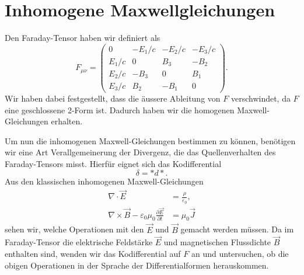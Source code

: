 %
%
%
%
\section{Inhomogene Maxwellgleichungen
	\label{maxwell:section:InhomogeneMaxwellgleichungen}}
Den Faraday-Tensor haben wir definiert als
\begin{equation*}
	F_{\mu \nu} = \begin{pmatrix}
		0 & -E_1/c & -E_2/c & -E_3/c \\ E_1/c & 0 & B_3 & -B_2 \\ E_2/c & -B_3 & 0 & B_1 \\ E_3/c & B_2 & -B_1 & 0 
	\end{pmatrix}.
\end{equation*}
Wir haben dabei festgestellt, dass die äussere Ableitung von $F$ verschwindet, da $F$ eine geschlossene 2-Form ist. Dadurch haben wir die homogenen Maxwell-Gleichungen erhalten. 

Um nun die inhomogenen Maxwell-Gleichungen bestimmen zu können, benötigen wir eine Art Verallgemeinerung der Divergenz, die das Quellenverhalten des Faraday-Tensors misst. Hierfür eignet sich das Kodifferential
\begin{equation*}
	\delta = \ast d {\ast}.
\end{equation*}
Aus den klassischen inhomogenen Maxwell-Gleichungen
\begin{align}
	\nabla \cdot \vec{E} &= \frac{\rho}{\varepsilon_0}
	\label{maxwell:section:inhomogeneMaxwellgleichungen:gaussE},\\
	\nabla \times \vec{B} - \varepsilon_0 \mu_0 \frac{\partial \vec{E}}{\partial t}&= \mu_0 \vec{J}
	\label{maxwell:section:inhomogeneMaxwellgleichungen:ampereMaxwell}
\end{align}
sehen wir, welche Operationen mit den $\vec{E}$ und $\vec{B}$ gemacht werden müssen.
Da im Faraday-Tensor die elektrische Feldstärke $\vec{E}$ und magnetischen Flussdichte $\vec{B}$ enthalten sind, wenden wir das Kodifferential auf $F$ an und untersuchen, ob die obigen Operationen in der Sprache der Differentialformen herauskommen.

